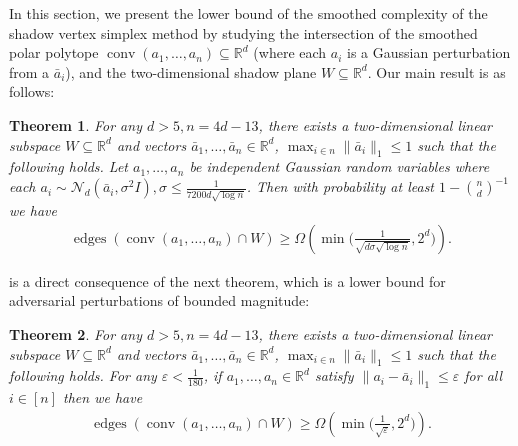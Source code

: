 \documentclass{article}\usepackage[a4paper,margin=20mm]{geometry}
\newtheorem{theorem}{Theorem}\newtheorem{lemma}[theorem]{Lemma}\newtheorem{proposition}[theorem]{Proposition}\newtheorem{corollary}[theorem]{Corollary}\newtheorem{definition}[theorem]{Definition}\newtheorem{claim}[theorem]{Claim}\newtheorem{remark}[theorem]{Remark}\newtheorem{observation}[theorem]{Observation}\newtheorem{conjecture}[theorem]{Conjecture}\newtheorem{example}[theorem]{Example}
\newcommand{\R}{\mathbb R}
\newcommand{\eps}{\varepsilon} %
\newcommand{\conv}{\operatorname{conv}}
\newcommand{\edges}{\operatorname{edges}}
\renewcommand{\subset}{\subseteq}
\begin{document}
In this section, we present the lower bound of the smoothed complexity of the shadow vertex simplex method by studying the intersection of the smoothed polar polytope \mbox{$\conv(a_1, \ldots, a_n) \subset \R^d$} (where each $a_i$ is a Gaussian perturbation from a $\bar a_i$), and the two-dimensional shadow plane $W \subset \R^d$. Our main result is as follows:

\begin{theorem}\label{thm:lb-main}
    For any $d > 5, n = 4d - 13$, there exists a two-dimensional linear subspace $W \subset \R^{d}$ and vectors $\bar a_1,\ldots,\bar a_n \in \R^d$, $\max_{i \in n} \|\bar{a}_i\|_1 \leq 1$ such that the following holds. 
    Let $a_1, \ldots, a_n$ be independent Gaussian random variables where each $a_i \sim \mathcal{N}_d(\bar{a}_i, \sigma^2 I), \sigma \leq \frac{1}{7200d\sqrt{\log n}}$.
    Then with probability at least $1 - \binom{n}{d}^{-1}$ we have
    \begin{align*} 
        \edges(\conv(a_1,\ldots,a_n) \cap W) \geq \Omega \left(\min \Big(\frac{1}{\sqrt{d\sigma\sqrt{\log n}}},2^d \Big) \right).
    \end{align*}
\end{theorem}

 is a direct consequence of the next theorem, which is a lower bound for adversarial perturbations of bounded magnitude:
\begin{theorem}\label{thm:lb-generic}
    For any $d > 5, n = 4d-13$, there exists a two-dimensional linear subspace $W \subset \R^{d}$ and vectors $\bar a_1,\ldots,\bar a_n \in \R^d$, $\max_{i \in n} \|\bar{a}_i\|_1 \leq 1$ such that the following holds. 
    For any $\eps < \frac{1}{180}$, if $a_1, \ldots, a_n \in \R^d$ satisfy $\|a_i - \bar a_i\|_1 \leq \eps$ for all $i \in [n]$
    then we have
    \begin{align*} 
        \edges(\conv(a_1,\ldots,a_n) \cap W) \geq \Omega \left(\min \Big(\frac{1}{\sqrt{\eps}},2^d \Big) \right).
    \end{align*}
\end{theorem}
\end{document}
